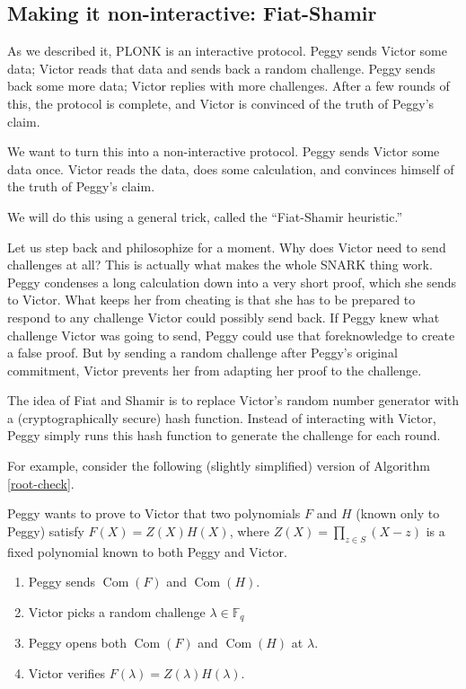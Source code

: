 \subsection{Making it non-interactive: Fiat-Shamir}

As we described it, PLONK is an interactive protocol. Peggy sends Victor
some data; Victor reads that data and sends back a random challenge.
Peggy sends back some more data; Victor replies with more challenges.
After a few rounds of this, the protocol is complete, and Victor is
convinced of the truth of Peggy's claim.

We want to turn this into a non-interactive protocol. Peggy sends Victor
some data once. Victor reads the data, does some calculation, and
convinces himself of the truth of Peggy's claim.

We will do this using a general trick, called the ``Fiat-Shamir
heuristic.''

Let us step back and philosophize for a moment. Why does Victor need to
send challenges at all? This is actually what makes the whole SNARK
thing work. Peggy condenses a long calculation down into a very short
proof, which she sends to Victor. What keeps her from cheating is that
she has to be prepared to respond to any challenge Victor could possibly
send back. If Peggy knew what challenge Victor was going to send, Peggy
could use that foreknowledge to create a false proof. But by sending a
random challenge after Peggy's original commitment, Victor prevents her
from adapting her proof to the challenge.

The idea of Fiat and Shamir is to replace Victor's random number
generator with a (cryptographically secure) hash function. Instead of
interacting with Victor, Peggy simply runs this hash function to
generate the challenge for each round.

For example, consider the following (slightly simplified) version of
Algorithm \ref{root-check}.

\begin{algorithm}
Peggy wants to prove to Victor that two polynomials \(F\) and \(H\)
(known only to Peggy) satisfy \(F(X) = Z(X)H(X)\), where
\(Z(X) = \prod_{z \in S}(X - z)\) is a fixed polynomial known to both
Peggy and Victor.

\begin{enumerate}
\item
  Peggy sends \(\operatorname{Com}(F)\) and \(\operatorname{Com}(H)\).
\item
  Victor picks a random challenge \(\lambda \in {\mathbb{F}}_{q}\)
\item
  Peggy opens both \(\operatorname{Com}(F)\) and
  \(\operatorname{Com}(H)\) at \(\lambda\).
\item
  Victor verifies \(F(\lambda) = Z(\lambda)H(\lambda)\).
\end{enumerate}
\end{algorithm}

